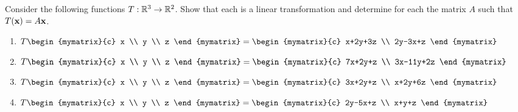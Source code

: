 \begin{ex} Consider the following functions $T:\mathbb{R}^{3}\rightarrow \mathbb{R}^{2}$.
  Show that each is a linear transformation and determine for each the matrix $A$ such that
  $T(\mbox{\bf x})=A\mbox{\bf x}$.

  \begin{enumerate}
  \item $T\begin{mymatrix}{c}
      x \\
      y \\
      z
    \end{mymatrix} =\begin{mymatrix}{c}
      x+2y+3z \\
      2y-3x+z
    \end{mymatrix} $

  \item $T\begin{mymatrix}{c}
      x \\
      y \\
      z
    \end{mymatrix} =\begin{mymatrix}{c}
      7x+2y+z \\
      3x-11y+2z
    \end{mymatrix} $

  \item $T\begin{mymatrix}{c}
      x \\
      y \\
      z
    \end{mymatrix} =\begin{mymatrix}{c}
      3x+2y+z \\
      x+2y+6z
    \end{mymatrix} $

  \item $T\begin{mymatrix}{c}
      x \\
      y \\
      z
    \end{mymatrix} =\begin{mymatrix}{c}
      2y-5x+z \\
      x+y+z
    \end{mymatrix} $
  \end{enumerate}
\end{ex}

